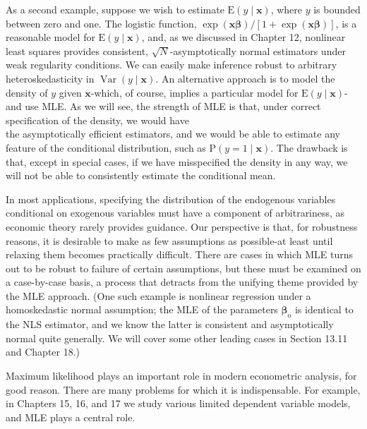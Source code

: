 \documentclass[10pt]{article}
\begin{document}
As a second example, suppose we wish to estimate $\mathrm{E}(y \mid \mathbf{x})$, where $y$ is bounded between zero and one. The logistic function, $\exp (\mathbf{x} \boldsymbol{\beta}) /[1+\exp (\mathbf{x} \boldsymbol{\beta})]$, is a reasonable model for $\mathrm{E}(y \mid \mathbf{x})$, and, as we discussed in Chapter 12, nonlinear least squares provides consistent, $\sqrt{N}$-asymptotically normal estimators under weak regularity conditions. We can easily make inference robust to arbitrary heteroskedasticity in $\operatorname{Var}(y \mid \mathbf{x})$. An alternative approach is to model the density of $y$ given $\mathbf{x}$-which, of course, implies a particular model for $\mathrm{E}(y \mid \mathbf{x})$-and use MLE. As we will see, the strength of MLE is that, under correct specification of the density, we would have\\
the asymptotically efficient estimators, and we would be able to estimate any feature of the conditional distribution, such as $\mathrm{P}(y=1 \mid \mathbf{x})$. The drawback is that, except in special cases, if we have misspecified the density in any way, we will not be able to consistently estimate the conditional mean.

In most applications, specifying the distribution of the endogenous variables conditional on exogenous variables must have a component of arbitrariness, as economic theory rarely provides guidance. Our perspective is that, for robustness reasons, it is desirable to make as few assumptions as possible-at least until relaxing them becomes practically difficult. There are cases in which MLE turns out to be robust to failure of certain assumptions, but these must be examined on a case-by-case basis, a process that detracts from the unifying theme provided by the MLE approach. (One such example is nonlinear regression under a homoskedastic normal assumption; the MLE of the parameters $\boldsymbol{\beta}_{\mathrm{o}}$ is identical to the NLS estimator, and we know the latter is consistent and asymptotically normal quite generally. We will cover some other leading cases in Section 13.11 and Chapter 18.)

Maximum likelihood plays an important role in modern econometric analysis, for good reason. There are many problems for which it is indispensable. For example, in Chapters 15, 16, and 17 we study various limited dependent variable models, and MLE plays a central role.
\end{document}
